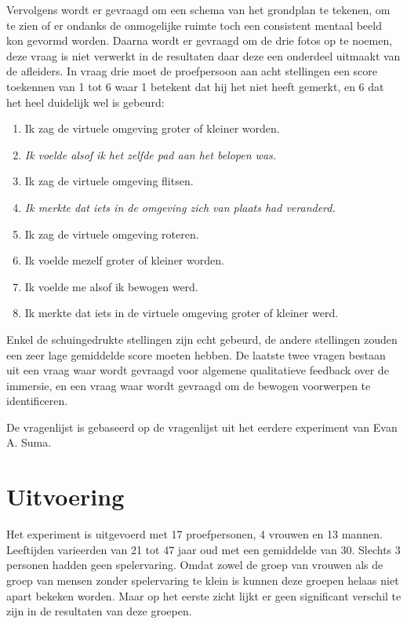 Vervolgens wordt er gevraagd om een schema van het grondplan te tekenen, om te
zien of er ondanks de onmogelijke ruimte toch een consistent mentaal beeld kon
gevormd worden. Daarna wordt er gevraagd om de drie fotos op te noemen, deze
vraag is niet verwerkt in de resultaten daar deze een onderdeel uitmaakt van de
afleiders. In vraag drie moet de proefpersoon aan acht stellingen een score 
toekennen van 1 tot 6 waar 1 betekent dat hij het niet heeft gemerkt, en 6 dat 
het heel duidelijk wel is gebeurd:

\begin{enumerate}
  \item Ik zag de virtuele omgeving groter of kleiner worden.
  \item \emph{Ik voelde alsof ik het zelfde pad aan het belopen was.}
  \item Ik zag de virtuele omgeving flitsen.
  \item \emph{Ik merkte dat iets in de omgeving zich van plaats had veranderd.}
  \item Ik zag de virtuele omgeving roteren.
  \item Ik voelde mezelf groter of kleiner worden.
  \item Ik voelde me alsof ik bewogen werd.
  \item Ik merkte dat iets in de virtuele omgeving groter of kleiner werd.
\end{enumerate}

Enkel de schuingedrukte stellingen zijn echt gebeurd, de andere stellingen zouden
een zeer lage gemiddelde score moeten hebben. De laatste twee vragen bestaan uit 
een vraag waar wordt gevraagd voor algemene qualitatieve feedback over de 
immersie, en een vraag waar wordt gevraagd om de bewogen voorwerpen te 
identificeren.

De vragenlijst is gebaseerd op de vragenlijst uit het eerdere experiment van Evan
A. Suma\cite{suma11}.


\section{Uitvoering}
Het experiment is uitgevoerd met 17 proefpersonen, 4 vrouwen en 13 mannen.
Leeftijden varieerden van 21 tot 47 jaar oud met een gemiddelde van 30. Slechts
3 personen hadden geen spelervaring. Omdat zowel de groep van vrouwen als de
groep van mensen zonder spelervaring te klein is kunnen deze groepen helaas
niet apart bekeken worden. Maar op het eerste zicht lijkt er geen significant
verschil te zijn in de resultaten van deze groepen.
